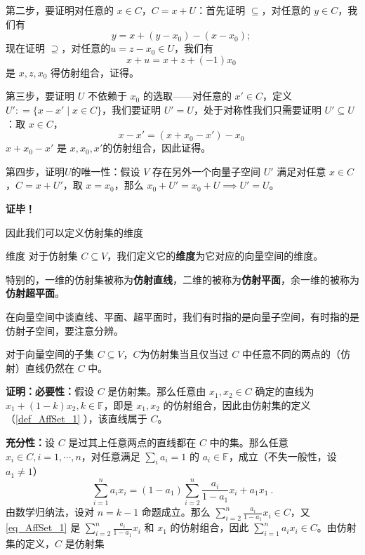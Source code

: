 第二步，要证明对任意的 $x \in C$，$C = x + U$：首先证明 $\subseteq$，对任意的 $y \in C$，我们有
\begin{equation}
y = x + (y - x_0) - (x - x_0); ~
\end{equation}
现在证明 $\supseteq$，对任意的$u  = z - x_0 \in U$，我们有
\begin{equation}
x + u = x + z + (-1) x_0 ~
\end{equation}
是 $x, z, x_0$ 得仿射组合，证得。

第三步，要证明 $U$ 不依赖于 $x_0$ 的选取——对任意的 $x' \in C$，定义 $U': = \{x - x' \mid x \in C\}$，我们要证明 $U' = U$，处于对称性我们只需要证明 $U' \subseteq U$：取 $x \in C$，
\begin{equation}
x - x' = (x + x_0 - x') - x_0 ~
\end{equation}
$x + x_0 - x'$ 是 $x, x_0, x'$的仿射组合，因此证得。

第四步，证明$U$的唯一性：假设 $V$ 存在另外一个向量子空间 $U'$ 满足对任意 $x \in C$，$C = x + U'$，取 $x = x_0$，那么 $x_0 + U' = x_0 + U \implies U' = U$。

\textbf{证毕！}

因此我们可以定义仿射集的维度
\begin{definition}{维度}
对于仿射集 $C \subseteq V$，我们定义它的\textbf{维度}为它对应的向量空间的维度。

特别的，一维的仿射集被称为\textbf{仿射直线}，二维的被称为\textbf{仿射平面}，余一维的被称为\textbf{仿射超平面}。
\end{definition}

在向量空间中谈直线、平面、超平面时，我们有时指的是向量子空间，有时指的是仿射子空间，要注意分辨。

\begin{theorem}{}\label{the_AffSet_1}
对于向量空间的子集 $C \subseteq V$，$C$为仿射集当且仅当过 $C$ 中任意不同的两点的（仿射）直线仍然在 $C$ 中。
\end{theorem}

\textbf{证明：}\textbf{必要性：}假设 $C$ 是仿射集。那么任意由 $x_1,x_2\in C$ 确定的直线为 $x_1+(1-k)x_2,k\in\mathbb F$，即是 $x_1,x_2$ 的仿射组合，因此由仿射集的定义（\autoref{def_AffSet_1} ），该直线属于 $C$。

\textbf{充分性：}设 $C$ 是过其上任意两点的直线都在 $C$ 中的集。那么任意 $x_i\in C,i=1,\cdots ,n$，对任意满足 $\sum_{i}a_i=1$ 的 $a_i\in\mathbb F$，成立（不失一般性，设 $a_1\neq1$）
\begin{equation}\label{eq_AffSet_1}
\sum_{i=1}^n a_ix_i=(1-a_1)\sum_{i=2}^n \frac{a_i}{1-a_1}x_i+a_1x_1~.
\end{equation}
由数学归纳法，设对 $n=k-1$ 命题成立。那么 $\sum_{i=2}^n \frac{a_i}{1-a_1}x_i\in C$，又\autoref{eq_AffSet_1} 是 $\sum_{i=2}^n \frac{a_i}{1-a_1}x_i$ 和 $x_1$ 的仿射组合，因此 $\sum_{i=1}^n a_ix_i\in C$。由仿射集的定义，$C$ 是仿射集

